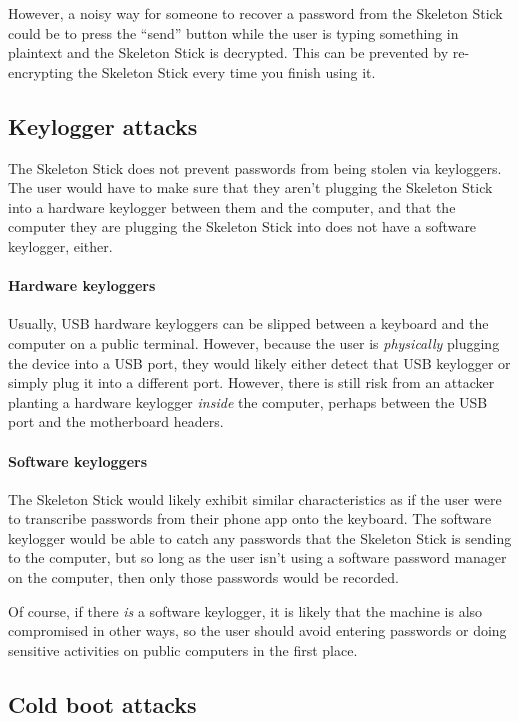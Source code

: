 \documentclass{article}
\begin{document}
However, a noisy way for someone to recover a password from the Skeleton Stick could be to press the ``send'' button while the user is typing something in plaintext and the Skeleton Stick is decrypted. This can be prevented by re-encrypting the Skeleton Stick every time you finish using it.

\subsection{Keylogger attacks}

The Skeleton Stick does not prevent passwords from being stolen via keyloggers. The user would have to make sure that they aren't plugging the Skeleton Stick into a hardware keylogger between them and the computer, and that the computer they are plugging the Skeleton Stick into does not have a software keylogger, either.

\paragraph{Hardware keyloggers} Usually, USB hardware keyloggers can be slipped between a keyboard and the computer on a public terminal. However, because the user is \textit{physically} plugging the device into a USB port, they would likely either detect that USB keylogger or simply plug it into a different port. However, there is still risk from an attacker planting a hardware keylogger \textit{inside} the computer, perhaps between the USB port and the motherboard headers.

\paragraph{Software keyloggers} The Skeleton Stick would likely exhibit similar characteristics as if the user were to transcribe passwords from their phone app onto the keyboard. The software keylogger would be able to catch any passwords that the Skeleton Stick is sending to the computer, but so long as the user isn't using a software password manager on the computer, then only those passwords would be recorded.

Of course, if there \textit{is} a software keylogger, it is likely that the machine is also compromised in other ways, so the user should avoid entering passwords or doing sensitive activities on public computers in the first place.

\subsection{Cold boot attacks}
\end{document}
